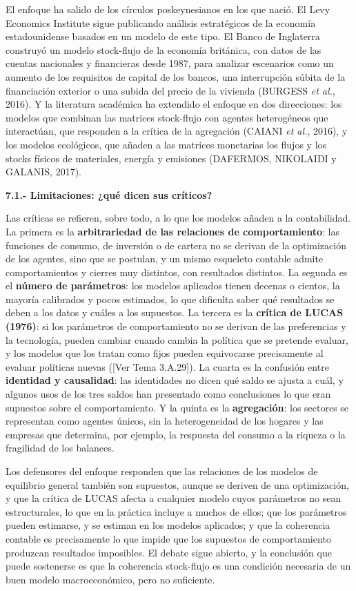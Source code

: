\documentclass[10pt,a4paper]{article}
\newcommand{\authorfont}[1]{{\fontfamily{EBGaramond-TLF}\selectfont #1}}
\begin{document}
El enfoque ha salido de los círculos poskeynesianos en los que nació. El Levy Economics Institute sigue publicando análisis estratégicos de la economía estadounidense basados en un modelo de este tipo. El Banco de Inglaterra construyó un modelo stock-flujo de la economía británica, con datos de las cuentas nacionales y financieras desde 1987, para analizar escenarios como un aumento de los requisitos de capital de los bancos, una interrupción súbita de la financiación exterior o una subida del precio de la vivienda (BURGESS \textit{et al.}, 2016). Y la literatura académica ha extendido el enfoque en dos direcciones: los modelos que combinan las matrices stock-flujo con agentes heterogéneos que interactúan, que responden a la crítica de la agregación (CAIANI \textit{et al.}, 2016), y los modelos ecológicos, que añaden a las matrices monetarias los flujos y los stocks físicos de materiales, energía y emisiones (DAFERMOS, NIKOLAIDI y GALANIS, 2017).

\textbf{7.1.- Limitaciones: ¿qué dicen sus críticos?}

Las críticas se refieren, sobre todo, a lo que los modelos añaden a la contabilidad. La primera es la \textbf{arbitrariedad de las relaciones de comportamiento}: las funciones de consumo, de inversión o de cartera no se derivan de la optimización de los agentes, sino que se postulan, y un mismo esqueleto contable admite comportamientos y cierres muy distintos, con resultados distintos. La segunda es el \textbf{número de parámetros}: los modelos aplicados tienen decenas o cientos, la mayoría calibrados y pocos estimados, lo que dificulta saber qué resultados se deben a los datos y cuáles a los supuestos. La tercera es la \textbf{crítica de LUCAS (1976)}: si los parámetros de comportamiento no se derivan de las preferencias y la tecnología, pueden cambiar cuando cambia la política que se pretende evaluar, y los modelos que los tratan como fijos pueden equivocarse precisamente al evaluar políticas nuevas ([\authorfont{Ver Tema 3.A.29}]). La cuarta es la confusión entre \textbf{identidad y causalidad}: las identidades no dicen qué saldo se ajusta a cuál, y algunos usos de los tres saldos han presentado como conclusiones lo que eran supuestos sobre el comportamiento. Y la quinta es la \textbf{agregación}: los sectores se representan como agentes únicos, sin la heterogeneidad de los hogares y las empresas que determina, por ejemplo, la respuesta del consumo a la riqueza o la fragilidad de los balances.

Los defensores del enfoque responden que las relaciones de los modelos de equilibrio general también son supuestos, aunque se deriven de una optimización, y que la crítica de LUCAS afecta a cualquier modelo cuyos parámetros no sean estructurales, lo que en la práctica incluye a muchos de ellos; que los parámetros pueden estimarse, y se estiman en los modelos aplicados; y que la coherencia contable es precisamente lo que impide que los supuestos de comportamiento produzcan resultados imposibles. El debate sigue abierto, y la conclusión que puede sostenerse es que la coherencia stock-flujo es una condición necesaria de un buen modelo macroeconómico, pero no suficiente.
\end{document}

